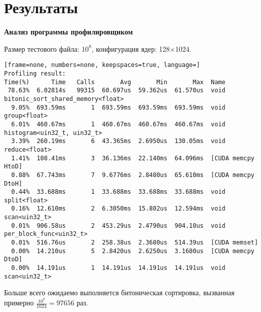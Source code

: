 \pagebreak
\section{Результаты}

\textbf{Анализ программы профилировщиком}

Размер тестового файла: $10^8$, конфигурация ядер: 128$\times$1024.

\begin{lstlisting}[frame=none, numbers=none, keepspaces=true, language=]
Profiling result:
Time(%)      Time   Calls       Avg       Min       Max  Name
 78.63%  6.02814s   99315  60.697us  59.362us  61.570us  void bitonic_sort_shared_memory<float>
  9.05%  693.59ms       1  693.59ms  693.59ms  693.59ms  void group<float>
  6.01%  460.67ms       1  460.67ms  460.67ms  460.67ms  void histogram<uin32_t, uin32_t>
  3.39%  260.19ms       6  43.365ms  2.6950us  130.05ms  void reduce<float>
  1.41%  108.41ms       3  36.136ms  22.140ms  64.096ms  [CUDA memcpy HtoD]
  0.88%  67.743ms       7  9.6776ms  2.8480us  65.610ms  [CUDA memcpy DtoH]
  0.44%  33.688ms       1  33.688ms  33.688ms  33.688ms  void split<float>
  0.16%  12.610ms       2  6.3050ms  15.802us  12.594ms  void scan<uin32_t>
  0.01%  906.58us       2  453.29us  2.4790us  904.10us  void per_block_func<uin32_t>
  0.01%  516.76us       2  258.38us  2.3680us  514.39us  [CUDA memset]
  0.00%  14.210us       5  2.8420us  2.6250us  3.1680us  [CUDA memcpy DtoD]
  0.00%  14.191us       1  14.191us  14.191us  14.191us  void scan<uin32_t>
\end{lstlisting}

Больше всего ожидаемо выполняется битоническая сортировка, вызванная примерно $\frac{10^8}{1024} = 97656$ раз.

